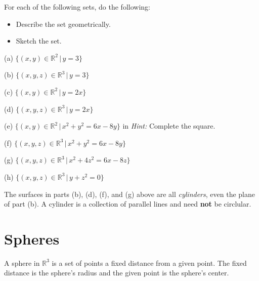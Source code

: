 \documentclass{ximera}
\begin{document}
\begin{question} \label{Q1:Coordinates}
For each of the following sets, do the following:

\begin{itemize}
\item{Describe the set geometrically.}

\item{Sketch the set.}

\end{itemize}

(a) $\{  (x,y)\in \mathbb{R}^2 \, | \, y=3  \}$

(b) $\{  (x,y,z)\in \mathbb{R}^3 \, | \, y=3  \}$

(c) $\{  (x,y)\in \mathbb{R}^2 \, | \, y=2x  \}$

(d) $\{  (x,y,z)\in \mathbb{R}^3 \, | \, y=2x  \}$

(e) $\{  (x,y)\in \mathbb{R}^2 \, | \,  x^2 + y^2 = 6x - 8y  \}$   in {\it Hint:} Complete the square.

(f)  $\{  (x,y,z)\in \mathbb{R}^3 \, | \, x^2 + y^2 = 6x - 8y  \}$

(g) $\{  (x,y,z)\in \mathbb{R}^3 \, | \, x^2 +4z^2 = 6x - 8z  \}$

(h) $\{  (x,y,z)\in \mathbb{R}^3 \, | \, y+z^2= 0  \}$

\end{question}

The surfaces in parts (b), (d), (f), and (g) above are all \emph{cylinders}, even the plane of part (b). A cylinder is a collection of parallel lines and need {\bf not} be circlular.


\section{Spheres}
A sphere in $\mathbb{R}^3$ is a set of points a fixed distance from a given point. The fixed distance is the sphere's radius and the given point is the sphere's center.
\end{document}

